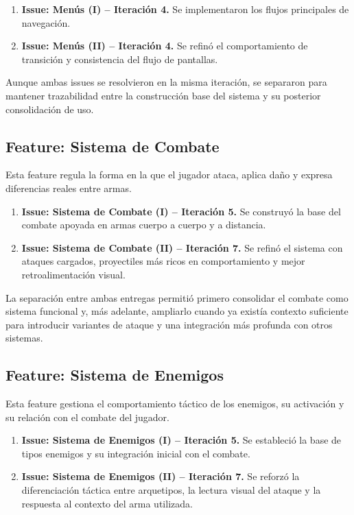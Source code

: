 \begin{enumerate}
\item \textbf{Issue: Menús (I) -- Iteración 4.} Se implementaron los flujos principales de navegación.
\item \textbf{Issue: Menús (II) -- Iteración 4.} Se refinó el comportamiento de transición y consistencia del flujo de pantallas.
\end{enumerate}

Aunque ambas issues se resolvieron en la misma iteración, se separaron para mantener trazabilidad entre
la construcción base del sistema y su posterior consolidación de uso.

\subsection{Feature: Sistema de Combate}
Esta feature regula la forma en la que el jugador ataca, aplica daño y expresa diferencias reales entre armas.

\begin{enumerate}
\item \textbf{Issue: Sistema de Combate (I) -- Iteración 5.} Se construyó la base del combate apoyada en armas cuerpo a cuerpo y a distancia.
\item \textbf{Issue: Sistema de Combate (II) -- Iteración 7.} Se refinó el sistema con ataques cargados, proyectiles más ricos en comportamiento y mejor retroalimentación visual.
\end{enumerate}

La separación entre ambas entregas permitió primero consolidar el combate como sistema funcional y, más adelante,
ampliarlo cuando ya existía contexto suficiente para introducir variantes de ataque y una integración más profunda
con otros sistemas.

\subsection{Feature: Sistema de Enemigos}
Esta feature gestiona el comportamiento táctico de los enemigos, su activación y su relación con el combate del jugador.

\begin{enumerate}
\item \textbf{Issue: Sistema de Enemigos (I) -- Iteración 5.} Se estableció la base de tipos enemigos y su integración inicial con el combate.
\item \textbf{Issue: Sistema de Enemigos (II) -- Iteración 7.} Se reforzó la diferenciación táctica entre arquetipos, la lectura visual del ataque y la respuesta al contexto del arma utilizada.
\end{enumerate}

